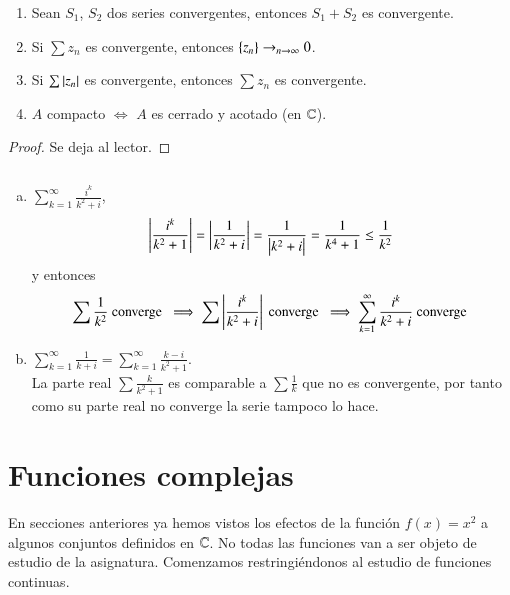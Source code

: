     \begin{pro}$ $
        \begin{enumerate}[1)]
            \item Sean $S_1$, $S_2$ dos series convergentes, entonces $S_1 + S_2$ es convergente.
            \item Si $\sum z_n$ es convergente, entonces $\left\{z_n\right\} \to_{n\to \infty} 0$.
            \item Si $\sum \left|z_n\right|$ es convergente, entonces $\sum z_n$ es convergente.
            \item $A$ compacto $\iff$ $A$ es cerrado y acotado (en $\mathbb{C}$).
        \end{enumerate}
    \end{pro}
    \begin{proof}
        Se deja al lector.
    \end{proof}

    \begin{eg}$ $
        \begin{enumerate}[a)]
            \item $\sum_{k=1}^{\infty} \frac{i^k}{k^2+i}$,
            $$
                \left|\frac{i^k}{k^2+1}\right| = \left|\frac{1}{k^2+i}\right| = \frac{1}{\left|k^2+i\right|} = \frac{1}{k^4+1} \leq \frac{1}{k^2}
            $$
            y entonces
            $$
                \sum \frac{1}{k^2} \text{ converge } \implies \sum \left|\frac{i^k}{k^2+i}\right| \text{ converge } \implies \sum_{k=1}^{\infty} \frac{i^k}{k^2+i} \text{ converge }
            $$
            \item $\sum_{k=1}^{\infty} \frac{1}{k+i} = \sum_{k=1}^{\infty} \frac{k-i}{k^2+1}$.\\

            La parte real $\sum \frac{k}{k^2+1}$ es comparable a $\sum \frac{1}{k}$ que no es convergente, por tanto como su parte real no converge la serie tampoco lo hace.
        \end{enumerate}
    \end{eg}

\section{Funciones complejas}

    En secciones anteriores ya hemos vistos los efectos de la función $f(x) = x^2$ a algunos conjuntos definidos en $\mathbb{C}$. No todas las funciones van a ser objeto de estudio de la asignatura. Comenzamos restringiéndonos al estudio de funciones continuas.


